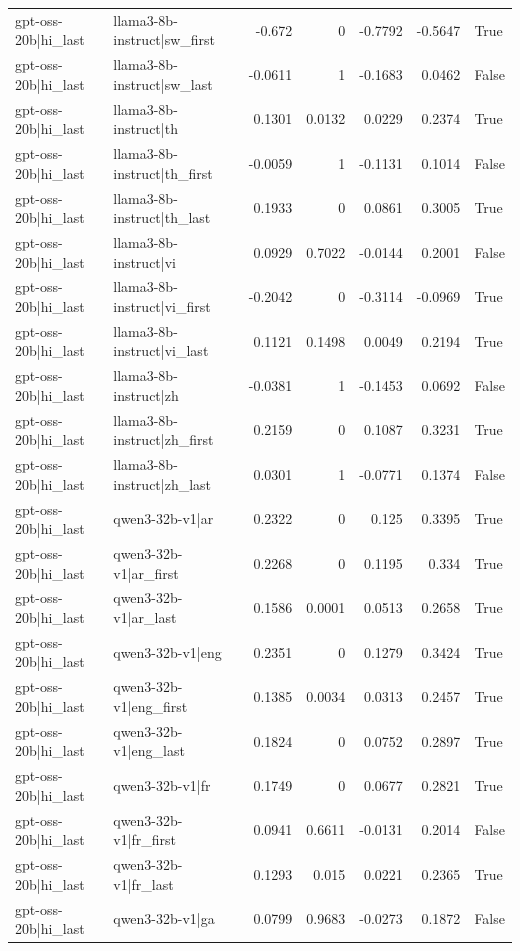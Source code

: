 \begin{table}
\begin{tabular}{l l r r r r l}
gpt-oss-20b|hi_last & llama3-8b-instruct|sw_first & -0.672 & 0 & -0.7792 & -0.5647 & True \\
gpt-oss-20b|hi_last & llama3-8b-instruct|sw_last & -0.0611 & 1 & -0.1683 & 0.0462 & False \\
gpt-oss-20b|hi_last & llama3-8b-instruct|th & 0.1301 & 0.0132 & 0.0229 & 0.2374 & True \\
gpt-oss-20b|hi_last & llama3-8b-instruct|th_first & -0.0059 & 1 & -0.1131 & 0.1014 & False \\
gpt-oss-20b|hi_last & llama3-8b-instruct|th_last & 0.1933 & 0 & 0.0861 & 0.3005 & True \\
gpt-oss-20b|hi_last & llama3-8b-instruct|vi & 0.0929 & 0.7022 & -0.0144 & 0.2001 & False \\
gpt-oss-20b|hi_last & llama3-8b-instruct|vi_first & -0.2042 & 0 & -0.3114 & -0.0969 & True \\
gpt-oss-20b|hi_last & llama3-8b-instruct|vi_last & 0.1121 & 0.1498 & 0.0049 & 0.2194 & True \\
gpt-oss-20b|hi_last & llama3-8b-instruct|zh & -0.0381 & 1 & -0.1453 & 0.0692 & False \\
gpt-oss-20b|hi_last & llama3-8b-instruct|zh_first & 0.2159 & 0 & 0.1087 & 0.3231 & True \\
gpt-oss-20b|hi_last & llama3-8b-instruct|zh_last & 0.0301 & 1 & -0.0771 & 0.1374 & False \\
gpt-oss-20b|hi_last & qwen3-32b-v1|ar & 0.2322 & 0 & 0.125 & 0.3395 & True \\
gpt-oss-20b|hi_last & qwen3-32b-v1|ar_first & 0.2268 & 0 & 0.1195 & 0.334 & True \\
gpt-oss-20b|hi_last & qwen3-32b-v1|ar_last & 0.1586 & 0.0001 & 0.0513 & 0.2658 & True \\
gpt-oss-20b|hi_last & qwen3-32b-v1|eng & 0.2351 & 0 & 0.1279 & 0.3424 & True \\
gpt-oss-20b|hi_last & qwen3-32b-v1|eng_first & 0.1385 & 0.0034 & 0.0313 & 0.2457 & True \\
gpt-oss-20b|hi_last & qwen3-32b-v1|eng_last & 0.1824 & 0 & 0.0752 & 0.2897 & True \\
gpt-oss-20b|hi_last & qwen3-32b-v1|fr & 0.1749 & 0 & 0.0677 & 0.2821 & True \\
gpt-oss-20b|hi_last & qwen3-32b-v1|fr_first & 0.0941 & 0.6611 & -0.0131 & 0.2014 & False \\
gpt-oss-20b|hi_last & qwen3-32b-v1|fr_last & 0.1293 & 0.015 & 0.0221 & 0.2365 & True \\
gpt-oss-20b|hi_last & qwen3-32b-v1|ga & 0.0799 & 0.9683 & -0.0273 & 0.1872 & False \\

\end{tabular}
\end{table}
